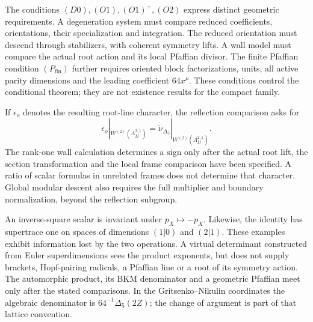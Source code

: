 The conditions \((D0),(O1),(O1)^+,(O2)\) express distinct
geometric requirements.  A degeneration system must compare
reduced coefficients, orientations, their specialization and
integration.  The reduced orientation must descend through
stabilizers, with coherent symmetry lifts.  A wall model must
compare the actual root action and its local Pfaffian divisor.
The finite Pfaffian condition \((P_{\mathrm{fin}})\) further
requires oriented block factorizations, units, all active parity
dimensions and the leading coefficient \(64x^\rho\).
These conditions control the conditional theorem; they are not
existence results for the compact family.

If \(\epsilon_o\) denotes the resulting root-line character,
the reflection comparison asks for
\begin{equation}\label{eq:zbps-orientation-equality}
 \epsilon_o|_{W^{(2)}(\Lambda_{II}^{2,1})}
 =\widetilde\nu_{\Delta_5}|_{W^{(2)}(\Lambda_{II}^{2,1})}.
\end{equation}
The rank-one wall calculation determines a sign only after the
actual root lift, the section transformation and the local frame
comparison have been specified.  A ratio of scalar formulas in
unrelated frames does not determine that character.  Global
modular descent also requires the full multiplier and boundary
normalization, beyond the reflection subgroup.

An inverse-square scalar is invariant under \(p_X\mapsto-p_X\).
Likewise, the identity has supertrace one on spaces of dimensions
\((1|0)\) and \((2|1)\).  These examples exhibit information
lost by the two operations.  A virtual determinant constructed
from Euler superdimensions sees the product exponents, but does
not supply brackets, Hopf-pairing radicals, a Pfaffian line or a
root of its symmetry action.  The automorphic product, its BKM
denominator and a geometric Pfaffian meet only after the stated
comparisons.  In the Gritsenko--Nikulin coordinates the algebraic
denominator is \(64^{-1}\Delta_5(2Z)\); the change of argument
is part of that lattice convention.

